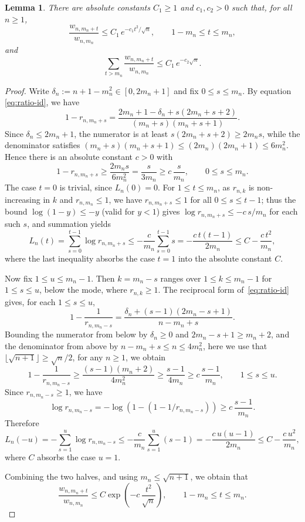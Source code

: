 \documentclass[english,11pt]{smfart}
\newtheorem{lemma}[theorem]{Lemma}
\numberwithin{equation}{section}
\begin{document}
\begin{lemma}
\label{le:domination}
There are absolute constants $C_1\ge1$ and $c_1,c_2>0$ such that, for all
$n\ge1$,
\[
\frac{w_{n,m_n+t}}{w_{n,m_n}}
\le C_1\,e^{-c_1 t^2/\sqrt n},
\qquad 1-m_n \le t \le m_n,
\]
and
\[
\sum_{t>m_n}\frac{w_{n,m_n+t}}{w_{n,m_n}}\le C_1\,e^{-c_2\sqrt n}.
\]
\end{lemma}
\begin{proof}
Write $\delta_n:=n+1-m_n^2\in[0,2m_n+1]$ and fix $0\le s\le m_n$. By equation \eqref{eq:ratio-id}, we have
\[
  1-r_{n,m_n+s}
  =\frac{2m_n+1-\delta_n+s(2m_n+s+2)}{(m_n+s)(m_n+s+1)} .
\]
Since $\delta_n\le 2m_n+1$, the numerator is at least $s(2m_n+s+2)\ge 2m_n s$,
while the denominator satisfies $(m_n+s)(m_n+s+1)\le(2m_n)(2m_n+1)\le 6m_n^2$.
Hence there is an absolute constant $c>0$ with
\[
  1-r_{n,m_n+s}\ge\frac{2m_n s}{6m_n^2}=\frac{s}{3m_n}\ge c\,\frac{s}{m_n},
  \qquad 0\le s\le m_n .
\]
The case $t=0$ is trivial, since $L_n(0)=0$. For $1\le t\le m_n$, as $r_{n,k}$ is
non-increasing in $k$ and $r_{n,m_n}\le1$, we have $r_{n,m_n+s}\le1$ for all
$0\le s\le t-1$; thus the bound $\log(1-y)\le-y$ (valid for $y<1$) gives
$\log r_{n,m_n+s}\le -c\,s/m_n$ for each such $s$, and summation yields
\[
  L_n(t)=\sum_{s=0}^{t-1}\log r_{n,m_n+s}
  \le -\frac{c}{m_n}\sum_{s=0}^{t-1}s
  = -\frac{c\,t(t-1)}{2m_n}
  \le C-\frac{c\,t^2}{m_n},
\]
where the last inequality absorbs the case $t=1$ into the absolute constant $C$.
\smallskip

Now fix $1\le u\le m_n-1$. Then $k=m_n-s$ ranges over
$1\le k\le m_n-1$ for $1\le s\le u$, below the mode, where $r_{n,k}\ge1$.
The reciprocal form of~\eqref{eq:ratio-id} gives, for each $1\le s\le u$,
\[
  1-\frac1{r_{n,m_n-s}}
  =\frac{\delta_n+(s-1)(2m_n-s+1)}{n-m_n+s}.
\]
Bounding the numerator from below by $\delta_n\ge0$ and $2m_n-s+1\ge m_n+2$, and
the denominator from above by $n-m_n+s\le n\le 4m_n^2$, here we use that
$\lfloor\sqrt{n+1}\rfloor \geq \sqrt{n}/2$, for any $n \geq 1$, we obtain
\[
  1-\frac1{r_{n,m_n-s}}\ge\frac{(s-1)(m_n+2)}{4m_n^2}
  \geq \frac{s-1}{4m_n}
  \ge c\,\frac{s-1}{m_n},
  \qquad 1\le s\le u.
\]
Since $r_{n,m_n-s}\ge1$, we have
\[
  \log r_{n,m_n-s}
  =
  -\log(1-(1-{1}/{r_{n,m_n-s}}))
  \ge c\,\frac{s-1}{m_n}.
\]
Therefore
\[
  L_n(-u)
  =-\sum_{s=1}^{u}\log r_{n,m_n-s}
  \le -\frac{c}{m_n}\sum_{s=1}^{u}(s-1)
  =-\frac{c\,u(u-1)}{2m_n}
  \le C-\frac{c\,u^2}{m_n},
\]
where $C$ absorbs the case $u=1$.
\smallskip

Combining the two halves, and using $m_n\le\sqrt{n+1}$, we obtain that
\begin{equation}\label{eq:central-bound}
  \frac{w_{n,m_n+t}}{w_{n,m_n}}\le C\exp\!\left(-c\,\frac{t^2}{\sqrt n}\right),
  \qquad 1-m_n\le t\le m_n .
\end{equation}


\end{proof}
\end{document}
